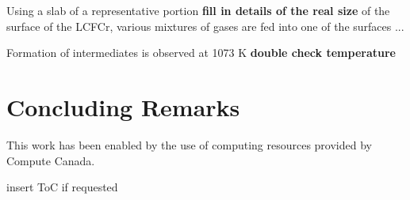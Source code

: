 \documentclass[journal=jpcafh,manuscript=article]{achemso}
\begin{document}
Using a slab of a representative portion \textbf{fill in details of the real size} of the surface of the LCFCr, various mixtures of gases are fed into one of the surfaces ...

Formation of intermediates is observed at 1073 K \textbf{double check temperature}

\section{Concluding Remarks}


\begin{acknowledgement}
This work has been enabled by the use of computing resources provided by Compute Canada.
\end{acknowledgement}

\pagebreak



\pagebreak
\begin{tocentry}
\begin{center}
insert ToC if requested
\end{center}
\end{tocentry}
\end{document}
